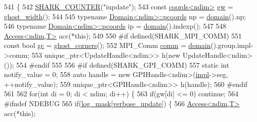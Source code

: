 \begin{DoxyCode}
541 \{
542         \hyperlink{globals_8hpp_abbe2b020b65cc72852ccd88c8cb2f4bb}{SHARK\_COUNTER}(\textcolor{stringliteral}{"iupdate"});
543     \textcolor{keyword}{const} \hyperlink{structshark_1_1ndim_1_1coords}{coords<ndim>} \hyperlink{classshark_1_1ndim_1_1_global_array_a38d93d114d585e5e5491c5ecd35c6bfc}{gw} = \hyperlink{classshark_1_1ndim_1_1_global_array_a5331f21887f3c14791b758e99656a676}{ghost\_width}();
544 
545     \textcolor{keyword}{typename} \hyperlink{classshark_1_1ndim_1_1_domain_a9684ccd8af33cff7639c782290ac37ee}{Domain<ndim>::pcoords} np = \hyperlink{classshark_1_1ndim_1_1_global_array_a435ee8ff23c3feadf2ef2be64d4f375c}{domain}().np;
546     \textcolor{keyword}{typename} \hyperlink{classshark_1_1ndim_1_1_domain_a9684ccd8af33cff7639c782290ac37ee}{Domain<ndim>::pcoords} ip = \hyperlink{classshark_1_1ndim_1_1_global_array_a435ee8ff23c3feadf2ef2be64d4f375c}{domain}().indexp();
547 
548     \hyperlink{classshark_1_1ndim_1_1_access}{Access<ndim,T>} acc(*\textcolor{keyword}{this});
549     
550 \textcolor{preprocessor}{#if defined(SHARK\_MPI\_COMM)}
551     \textcolor{keyword}{const} \textcolor{keywordtype}{bool} \hyperlink{classshark_1_1ndim_1_1_global_array_a100f4d523420deffde330079df7501e2}{gc} = \hyperlink{classshark_1_1ndim_1_1_global_array_abf0c9312657087578f89e1279ee6c451}{ghost\_corners}();
552     MPI\_Comm \hyperlink{namespaceshark_addbd5781efcffd1b0502c83220027b90}{comm} = \hyperlink{classshark_1_1ndim_1_1_global_array_a435ee8ff23c3feadf2ef2be64d4f375c}{domain}().group.impl->comm;
553     unique\_ptr<UpdateHandle<ndim>> h(\textcolor{keyword}{new} UpdateHandle<ndim>());
554 \textcolor{preprocessor}{#endif}
555 
556 \textcolor{preprocessor}{#if defined(SHARK\_GPI\_COMM)}
557         \textcolor{keyword}{static} \textcolor{keywordtype}{int} notify\_value = 0;
558         \textcolor{keyword}{auto} handle = \textcolor{keyword}{new} GPIHandle<ndim>(\hyperlink{classshark_1_1ndim_1_1_global_array_a70684121da4badfef791c15d7076282f}{impl}->seg, ++notify\_value);
559     unique\_ptr<GPIHandle<ndim>> h(handle);
560 \textcolor{preprocessor}{#endif}
561 
562     \textcolor{keywordflow}{for}(\textcolor{keywordtype}{int} di = 0; di < ndim; di++) \{
563         \textcolor{keywordflow}{if}(gw[di] <= 0) \textcolor{keywordflow}{continue};
564 \textcolor{preprocessor}{#ifndef NDEBUG}
565                 \textcolor{keywordflow}{if}(\hyperlink{namespaceshark_a110e03e8104b06caef346fcc25621aa9}{log\_mask}[\hyperlink{namespaceshark_a054837402a3923de5acc50070b378cd6}{verbose\_update}]) \{
566                         \hyperlink{classshark_1_1ndim_1_1_access}{Access<ndim,T>} acc(*\textcolor{keyword}{this});

\end{DoxyCode}
